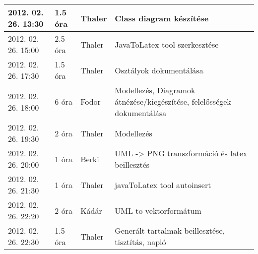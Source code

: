 \begin{center}
\begin{tabular}{| l | p{1.9cm} | p{2.6cm} | p{6.1cm} |}
2012. 02. 26. 13:30 & 1.5 óra & Thaler & Class diagram készítése\\ \hline
2012. 02. 26. 15:00 & 2.5 óra & Thaler & JavaToLatex tool szerkesztése\\ \hline
2012. 02. 26. 17:30 & 1.5 óra & Thaler & Osztályok dokumentálása\\ \hline
2012. 02. 26. 18:00 & 6 óra & Fodor & Modellezés, Diagramok átnézése/kiegészítése, felelősségek dokumentálása\\ \hline
2012. 02. 26. 19:30 & 2 óra & Thaler & Modellezés\\ \hline
2012. 02. 26. 20:00 & 1 óra & Berki & UML -> PNG transzformáció és latex beillesztés\\ \hline
2012. 02. 26. 21:30 & 1 óra & Thaler & javaToLatex tool autoinsert\\ \hline
2012. 02. 26. 22:20 & 2 óra & Kádár & UML to vektorformátum\\ \hline
2012. 02. 26. 22:30 & 1.5 óra & Thaler & Generált tartalmak beillesztése, tisztítás, napló\\ \hline

            \hline
        \end{tabular}
    \end{center}

